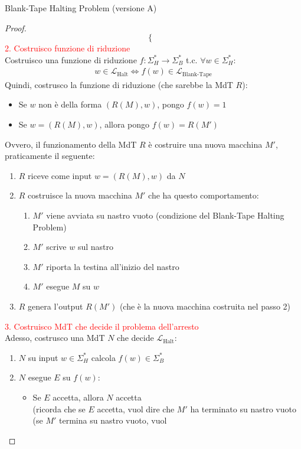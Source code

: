 \documentclass{article}  %
\theoremstyle{definition}
\begin{document}
\begin{theorem}{Blank-Tape Halting Problem (versione A)}
\begin{proof}
\[\begin{cases}
    \end{cases}
    \]
    \textcolor{red}{2. Costruisco funzione di riduzione} \\
    Costruisco una funzione di riduzione $f: \Sigma_H^* \rightarrow \Sigma_B^*$ t.c. $\forall{w} \in \Sigma_H^*$:
    \begin{align*}
      w \in \mathcal{L}_{\text{Halt}} \iff f(w) \in \mathcal{L}_{\text{Blank-Tape}}
    \end{align*}
    Quindi, costrusco la funzione di riduzione (che sarebbe la MdT $R$):
    \begin{itemize}
      \item Se $w$ non è della forma $(R(M),w)$, pongo $f(w)=1$
      \item Se $w=(R(M),w)$, allora pongo $f(w)=R(M')$
    \end{itemize}
    Ovvero, il funzionamento della MdT $R$ è costruire una nuova macchina $M'$, praticamente il seguente:
    \begin{enumerate}
      \item $R$ riceve come input $w=(R(M),w)$ da $N$
      \item $R$ costruisce la nuova macchina $M'$ che ha questo comportamento:
      \begin{enumerate}
        \item $M'$ viene avviata su nastro vuoto (condizione del Blank-Tape Halting Problem)
        \item $M'$ scrive $w$ sul nastro
        \item $M'$ riporta la testina all'inizio del nastro
        \item $M'$ esegue $M$ su $w$
      \end{enumerate}
      \item $R$ genera l'output $R(M')$ (che è la nuova macchina costruita nel passo 2)
    \end{enumerate}
    \textcolor{red}{3. Costruisco MdT che decide il problema dell'arresto} \\
    Adesso, costrusco una MdT $N$ che decide $\mathcal{L}_{\text{Halt}}$:
    \begin{enumerate}
      \item $N$ su input $w \in \Sigma_H^*$ calcola $f(w) \in \Sigma_B^*$
      \item $N$ esegue $E$ su $f(w)$:
      \begin{itemize}
        \item Se $E$ accetta, allora $N$ accetta \\
        (ricorda che se $E$ accetta, vuol dire che $M'$ ha terminato su nastro vuoto (se $M'$ termina su nastro vuoto, vuol

\end{itemize}
\end{enumerate}
\end{proof}
\end{theorem}
\end{document}

